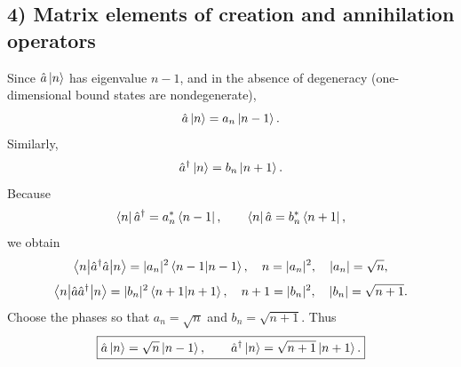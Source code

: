 \subsection*{4) Matrix elements of creation and annihilation operators}
Since $\hat{a}\left|n\right\rangle$ has eigenvalue $n-1$, and in the absence of degeneracy (one-dimensional bound states are nondegenerate),
\begin{equation}
\hat{a}\left|n\right\rangle=a_n\left|n-1\right\rangle.
\end{equation}
Similarly,
\begin{equation}
\hat{a}^{\dagger}\left|n\right\rangle=b_n\left|n+1\right\rangle.
\end{equation}
Because
\begin{equation}
\left\langle n\right|\hat{a}^{\dagger}=a_n^*\left\langle n-1\right|,\qquad
\left\langle n\right|\hat{a}=b_n^*\left\langle n+1\right|,
\end{equation}
we obtain
\begin{equation}
\left\langle n\middle|\hat{a}^{\dagger}\hat{a}\middle|n\right\rangle=|a_n|^2\left\langle n-1\middle|n-1\right\rangle,\quad n=|a_n|^2,\quad |a_n|=\sqrt n,
\end{equation}
\begin{equation}
\left\langle n\middle|\hat{a}\hat{a}^{\dagger}\middle|n\right\rangle=|b_n|^2\left\langle n+1\middle|n+1\right\rangle,\quad
n+1=|b_n|^2,\quad |b_n|=\sqrt{n+1}.
\end{equation}
Choose the phases so that $a_n=\sqrt n$ and $b_n=\sqrt{n+1}$. Thus
\begin{equation}
\boxed{\hat{a}\left|n\right\rangle=\sqrt n\left|n-1\right\rangle,\qquad
\hat{a}^{\dagger}\left|n\right\rangle=\sqrt{n+1}\left|n+1\right\rangle.}
\end{equation}

